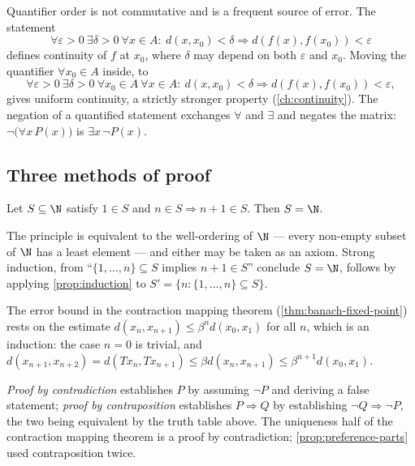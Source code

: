 Quantifier order is not commutative and is a frequent source of error. The
statement
\[
	\forall\varepsilon>0\ \exists\delta>0\ \forall x\in A:\ d(x,x_0)<\delta
	\Rightarrow d(f(x),f(x_0))<\varepsilon
\]
defines continuity of $f$ at $x_0$, where $\delta$ may depend on both
$\varepsilon$ and $x_0$. Moving the quantifier $\forall x_0\in A$ inside, to
\[
	\forall\varepsilon>0\ \exists\delta>0\ \forall x_0\in A\ \forall x\in A:\
	d(x,x_0)<\delta\Rightarrow d(f(x),f(x_0))<\varepsilon,
\]
gives uniform continuity, a strictly stronger property
(\autoref{ch:continuity}). The negation of a quantified statement exchanges
$\forall$ and $\exists$ and negates the matrix:
$\neg\bigl(\forall x\, P(x)\bigr)$ is $\exists x\,\neg P(x)$.

\subsection{Three methods of proof}

\begin{proposition}\label{prop:induction}
	Let $S\subseteq\N$ satisfy $1\in S$ and $n\in S\Rightarrow n+1\in S$. Then
	$S=\N$.
\end{proposition}

The principle is equivalent to the well-ordering of $\N$ --- every non-empty
subset of $\N$ has a least element --- and either may be taken as an axiom.
Strong induction, from ``$\{1,\dots,n\}\subseteq S$ implies $n+1\in S$'' conclude
$S=\N$, follows by applying \autoref{prop:induction} to
$S'=\{n : \{1,\dots,n\}\subseteq S\}$.

\begin{eg}\label{eg:induction-contraction}
	The error bound in the contraction mapping theorem
	(\autoref{thm:banach-fixed-point}) rests on the estimate
	$d(x_n,x_{n+1})\leq\beta^n d(x_0,x_1)$ for all $n$, which is an induction: the
	case $n=0$ is trivial, and
	$d(x_{n+1},x_{n+2})=d(Tx_n,Tx_{n+1})\leq\beta d(x_n,x_{n+1})\leq
		\beta^{n+1}d(x_0,x_1)$.
\end{eg}

\emph{Proof by contradiction} establishes $P$ by assuming $\neg P$ and deriving a
false statement; \emph{proof by contraposition} establishes $P\Rightarrow Q$ by
establishing $\neg Q\Rightarrow\neg P$, the two being equivalent by the truth
table above. The uniqueness half of the contraction mapping theorem is a proof by
contradiction; \autoref{prop:preference-parts} used contraposition twice.

